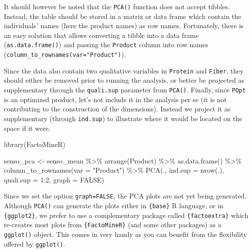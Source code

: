 \documentclass[
]{krantz}
\makeatletter
\newenvironment{Shaded}{\begin{snugshade}}{\end{snugshade}}
\newcommand{\AttributeTok}[1]{\textcolor[rgb]{0.61,0.61,0.61}{#1}}
\newcommand{\ConstantTok}[1]{\textcolor[rgb]{0,0,0}{#1}}
\newcommand{\DecValTok}[1]{\textcolor[rgb]{0.06,0.06,0.06}{#1}}
\newcommand{\FunctionTok}[1]{\textcolor[rgb]{0,0,0}{#1}}
\newcommand{\NormalTok}[1]{#1}
\newcommand{\OtherTok}[1]{\textcolor[rgb]{0.37,0.37,0.37}{#1}}
\newcommand{\SpecialCharTok}[1]{\textcolor[rgb]{0,0,0}{#1}}
\newcommand{\StringTok}[1]{\textcolor[rgb]{0.5,0.5,0.5}{#1}}
\newenvironment{kframe}{%
\medskip{}
\setlength{\fboxsep}{.8em}
 \def\at@end@of@kframe{}%
 \ifinner\ifhmode%
  \def\at@end@of@kframe{\end{minipage}}%
  \begin{minipage}{\columnwidth}%
 \fi\fi%
 \def\FrameCommand##1{\hskip\@totalleftmargin \hskip-\fboxsep
 \colorbox{shadecolor}{##1}\hskip-\fboxsep
     \hskip-\linewidth \hskip-\@totalleftmargin \hskip\columnwidth}%
 \MakeFramed {\advance\hsize-\width
   \@totalleftmargin\z@ \linewidth\hsize
   \@setminipage}}%
 {\par\unskip\endMakeFramed%
 \at@end@of@kframe}
\renewenvironment{Shaded}{\begin{kframe}}{\end{kframe}}
\makeatother
\begin{document}
It should however be noted that the \texttt{PCA()} function does not accept tibbles. Instead, the table should be stored in a matrix or data frame which contain the individuals' names (here the product names) as row names. Fortunately, there is an easy solution that allows converting a tibble into a data frame (\texttt{as.data.frame()}) and passing the \texttt{Product} column into row names (\texttt{column\_to\_rownames(var="Product")}).

Since the data also contain two qualitative variables in \texttt{Protein} and \texttt{Fiber}, they should either be removed prior to running the analysis, or better be projected as supplementary through the \texttt{quali.sup} parameter from \texttt{PCA()}. Finally, since \texttt{POpt} is an optimized product, let's not include it in the analysis per se (it is not contributing to the construction of the dimensions). Instead we project it as supplementary (through \texttt{ind.sup}) to illustrate where it would be located on the space if it were.

\begin{Shaded}
\begin{Highlighting}[]
\FunctionTok{library}\NormalTok{(FactoMineR)}

\NormalTok{senso\_pca }\OtherTok{\textless{}{-}}\NormalTok{ senso\_mean }\SpecialCharTok{\%\textgreater{}\%}
  \FunctionTok{arrange}\NormalTok{(Product) }\SpecialCharTok{\%\textgreater{}\%}
  \FunctionTok{as.data.frame}\NormalTok{() }\SpecialCharTok{\%\textgreater{}\%}
  \FunctionTok{column\_to\_rownames}\NormalTok{(}\AttributeTok{var =} \StringTok{"Product"}\NormalTok{) }\SpecialCharTok{\%\textgreater{}\%}
  \FunctionTok{PCA}\NormalTok{(., }\AttributeTok{ind.sup =} \FunctionTok{nrow}\NormalTok{(.), }\AttributeTok{quali.sup =} \DecValTok{1}\SpecialCharTok{:}\DecValTok{2}\NormalTok{, }\AttributeTok{graph =} \ConstantTok{FALSE}\NormalTok{)}
\end{Highlighting}
\end{Shaded}

Since we set the option \texttt{graph=FALSE}, the PCA plots are not yet being generated. Although \texttt{PCA()} can generate the plots either in \texttt{\{base\}} R language, or in \texttt{\{ggplot2\}}, we prefer to use a complementary package called \texttt{\{factoextra\}} which re-creates most plots from \texttt{\{FactoMineR\}} (and some other packages) as a \texttt{ggplot()} object. This comes in very handy as you can benefit from the flexibility offered by \texttt{ggplot()}.
\end{document}
